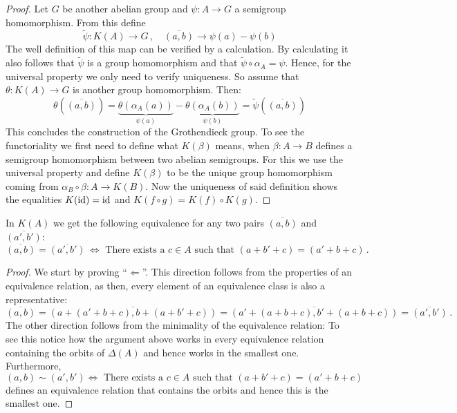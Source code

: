 \begin{proof}
Let $G$ be another abelian group and $\psi: A\to G$ a semigroup homomorphism. From this define 
\begin{equation*}
	\tilde{\psi}:K(A)\to G\,,\quad  \overline{(a,b)} \to \psi(a)-\psi(b)
\end{equation*} The well definition of this map can be verified by a calculation. By calculating it also follows that $\tilde{\psi}$ is a group homomorphism and that $\tilde{\psi}\circ \alpha_A=\psi$. Hence, for the universal property we only need to verify uniqueness. So assume that $\theta:K(A)\to G$ is another group homomorphism. Then:
\begin{equation*}
	\theta\left(\overline{(a,b)}\right)=\underbrace{\theta(\alpha_A(a))}_{\psi(a)}-\underbrace{\theta(\alpha_A(b))}_{\psi(b)}=\tilde{\psi}\left(\overline{(a,b)}\right)
\end{equation*}
This concludes the construction of the Grothendieck group. To see the functoriality we first need to define what $K(\beta)$ means, when $\beta: A\to B$ defines a semigroup homomorphism between two abelian semigroups. For this we use the universal property and define $K(\beta)$ to be the unique group homomorphism coming from $\alpha_B\circ \beta : A \to K(B)$. Now the uniqueness of said definition shows the equalities $K(\operatorname{\mathrm{id}})=\operatorname{\mathrm{id}}$ and $K(f\circ g)=K(f)\circ K(g)$.
\end{proof}



\begin{remark}\label{rem:kTheo-grothendieckEquivalence}
In $K(A)$ we get the following equivalence for any two pairs $\overline{(a,b)}$ and $\overline{(a',b')}$:
\begin{equation*}
	\overline{(a,b)}=\overline{(a',b')}\,\Leftrightarrow \text{ There exists a } c\in A \text{ such that } (a+b'+c)=(a'+b+c)\,.
\end{equation*}	
\end{remark}
\begin{proof}
	We start by proving \enquote{$\Leftarrow$}. This direction follows from the properties of an equivalence relation, as then, every element of an equivalence class is also a representative:
	\begin{equation} \label{eq:kTheo-theGrothendiekRelation}
		\overline{(a,b)}=\overline{(a+(a'+b+c),b+(a+b'+c))}=\overline{(a'+(a+b+c),b'+(a+b+c))}=\overline{(a',b')}\,.
	\end{equation} The other direction follows from the minimality of the equivalence relation: To see this notice how the argument above works in every equivalence relation containing the orbits of $\Delta(A)$ and hence works in the smallest one. Furthermore, \begin{equation*}
		(a,b)\sim(a',b')\Leftrightarrow\text{ There exists a } c\in A \text{ such that } (a+b'+c)=(a'+b+c)
	\end{equation*}defines an equivalence relation that contains the orbits and hence this is the smallest one.
\end{proof}


